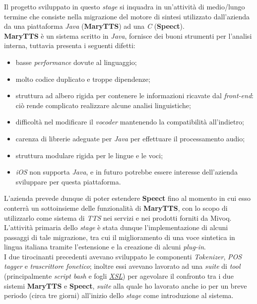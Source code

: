 Il progetto sviluppato in questo \textit{stage} si inquadra in un'attività di medio/lungo termine che consiste nella migrazione 
del motore di sintesi utilizzato dall'azienda da una piattaforma \textit{Java} (\textbf{MaryTTS}) ad una \textit{C} (\textbf{Speect}). \\
\textbf{MaryTTS} è un sistema scritto in \textit{Java}, fornisce dei buoni strumenti per l'analisi interna, tuttavia presenta i seguenti difetti:
   \begin{itemize}
        \item basse \textit{performance} dovute al linguaggio; 
        \item molto codice duplicato e troppe dipendenze; 
        \item struttura ad albero rigida per contenere le informazioni ricavate dal \textit{front-end}: ciò rende complicato
              realizzare alcune analisi linguistiche;
        \item difficoltà nel modificare il \textit{vocoder} mantenendo la compatibilità all'indietro;
        \item carenza di librerie adeguate per \textit{Java} per effettuare il processamento audio;
        \item struttura modulare rigida per le lingue e le voci;
        \item \textit{iOS} non supporta \textit{Java}, e in futuro potrebbe essere interesse dell'azienda sviluppare per questa piattaforma.
   \end{itemize}
L'azienda prevede dunque di poter estendere \textbf{Speect} fino al momento in cui esso conterrà un sottoinsieme delle funzionalità
di \textbf{MaryTTS}, con lo scopo di utilizzarlo come sistema di \textit{TTS} nei servizi e nei prodotti forniti da Mivoq. \\
L'attività primaria dello \textit{stage} è stata dunque l'implementazione di alcuni passaggi di tale migrazione, tra cui il miglioramento
di una voce sintetica in lingua italiana tramite l'estensione e la creazione di alcuni \textit{plug-in}. \\
I due tirocinanti precedenti avevano sviluppato le componenti \textit{Tokenizer}, \textit{POS tagger} e \textit{trascrittore fonetico};
inoltre essi avevano lavorato ad una \textit{suite} di \textit{tool} (principalmente \textit{script bash} e fogli \hyperref[glo:xsl]{\emph{XSL}\glsfirstoccur}) 
per agevolare il confronto tra i due sistemi \textbf{MaryTTS} e \textbf{Speect}, \textit{suite} alla quale ho lavorato anche io per un
 breve periodo (circa tre giorni) all'inizio dello \textit{stage} come introduzione al sistema. \\
